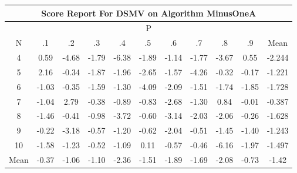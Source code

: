 \documentclass[11pt,a4paper]{report}
\begin{document}
\begin{longtable}{ | c || c | c | c | c | c | c | c | c | c || c |}
\hline
\multicolumn{11}{|c|}{ Score Report For DSMV on Algorithm MinusOneA} \\
\hline
\multicolumn{11}{|c|}{ P } \\
\hline
N & .1 & .2 & .3 & .4 & .5 & .6 & .7 & .8 & .9 & Mean\\
 \hline
 \hline
 \endhead
  4 &  \cellcolor[HTML]{EFEFFF} 0.59 &  \cellcolor[HTML]{FF8787} -4.68 &  \cellcolor[HTML]{FFCFCF} -1.79 &  \cellcolor[HTML]{FF6060} -6.38 &  \cellcolor[HTML]{FFCFCF} -1.89 &  \cellcolor[HTML]{FFDFDF} -1.14 &  \cellcolor[HTML]{FFCFCF} -1.77 &  \cellcolor[HTML]{FF9F9F} -3.67 &  \cellcolor[HTML]{EFEFFF} 0.55 & -2.244 \\
  5 &  \cellcolor[HTML]{C7C7FF} 2.16 &  \cellcolor[HTML]{FFF7F7} -0.34 &  \cellcolor[HTML]{FFCFCF} -1.87 &  \cellcolor[HTML]{FFCFCF} -1.96 &  \cellcolor[HTML]{FFBFBF} -2.65 &  \cellcolor[HTML]{FFD7D7} -1.57 &  \cellcolor[HTML]{FF9797} -4.26 &  \cellcolor[HTML]{FFF7F7} -0.32 &  \cellcolor[HTML]{FFF7F7} -0.17 & -1.221 \\
  6 &  \cellcolor[HTML]{FFE7E7} -1.03 &  \cellcolor[HTML]{FFF7F7} -0.35 &  \cellcolor[HTML]{FFD7D7} -1.59 &  \cellcolor[HTML]{FFDFDF} -1.30 &  \cellcolor[HTML]{FF9797} -4.09 &  \cellcolor[HTML]{FFC7C7} -2.09 &  \cellcolor[HTML]{FFD7D7} -1.51 &  \cellcolor[HTML]{FFD7D7} -1.74 &  \cellcolor[HTML]{FFCFCF} -1.85 & -1.728 \\
  7 &  \cellcolor[HTML]{FFE7E7} -1.04 &  \cellcolor[HTML]{B7B7FF} 2.79 &  \cellcolor[HTML]{FFF7F7} -0.38 &  \cellcolor[HTML]{FFE7E7} -0.89 &  \cellcolor[HTML]{FFE7E7} -0.83 &  \cellcolor[HTML]{FFBFBF} -2.68 &  \cellcolor[HTML]{FFDFDF} -1.30 &  \cellcolor[HTML]{E7E7FF} 0.84 &  \cellcolor[HTML]{FFFFFF} -0.01 & -0.387 \\
  8 &  \cellcolor[HTML]{FFD7D7} -1.46 &  \cellcolor[HTML]{FFF7F7} -0.41 &  \cellcolor[HTML]{FFE7E7} -0.98 &  \cellcolor[HTML]{FF9F9F} -3.72 &  \cellcolor[HTML]{FFEFEF} -0.60 &  \cellcolor[HTML]{FFAFAF} -3.14 &  \cellcolor[HTML]{FFCFCF} -2.03 &  \cellcolor[HTML]{FFCFCF} -2.06 &  \cellcolor[HTML]{FFF7F7} -0.26 & -1.628 \\
  9 &  \cellcolor[HTML]{FFF7F7} -0.22 &  \cellcolor[HTML]{FFAFAF} -3.18 &  \cellcolor[HTML]{FFEFEF} -0.57 &  \cellcolor[HTML]{FFDFDF} -1.20 &  \cellcolor[HTML]{FFEFEF} -0.62 &  \cellcolor[HTML]{FFCFCF} -2.04 &  \cellcolor[HTML]{FFEFEF} -0.51 &  \cellcolor[HTML]{FFD7D7} -1.45 &  \cellcolor[HTML]{FFDFDF} -1.40 & -1.243 \\
  10 &  \cellcolor[HTML]{FFD7D7} -1.58 &  \cellcolor[HTML]{FFDFDF} -1.23 &  \cellcolor[HTML]{FFEFEF} -0.52 &  \cellcolor[HTML]{FFE7E7} -1.09 &  \cellcolor[HTML]{FFFFFF} 0.11 &  \cellcolor[HTML]{FFEFEF} -0.57 &  \cellcolor[HTML]{FFF7F7} -0.46 &  \cellcolor[HTML]{FF6868} -6.16 &  \cellcolor[HTML]{FFCFCF} -1.97 & -1.497 \\
 \hline
 \hline
Mean &  \cellcolor[HTML]{FFF7F7} -0.37 &  \cellcolor[HTML]{FFE7E7} -1.06 &  \cellcolor[HTML]{FFE7E7} -1.10 &  \cellcolor[HTML]{FFC7C7} -2.36 &  \cellcolor[HTML]{FFD7D7} -1.51 &  \cellcolor[HTML]{FFCFCF} -1.89 &  \cellcolor[HTML]{FFD7D7} -1.69 &  \cellcolor[HTML]{FFC7C7} -2.08 &  \cellcolor[HTML]{FFEFEF} -0.73 &  \cellcolor[HTML]{FFDFDF} -1.42
\end{longtable}
\end{document}
